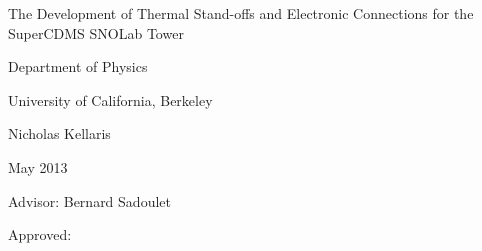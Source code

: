\documentclass{report}
\begin{document}
\begin{titlepage}
\null\vfill
\begin{center}{\Large The Development of Thermal Stand-offs and Electronic Connections for the SuperCDMS SNOLab Tower}\par\vskip1cm
Department of Physics\par
University of California, Berkeley\par
\vskip1cm
Nicholas Kellaris \par
May 2013\par
\vskip1cm
Advisor: Bernard Sadoulet\par
\vskip0.5cm
Approved:\ \ \ \ \ \ \ \ \qquad \qquad \qquad \ \ 



\end{center}\vfill


\end{titlepage}
\end{document}
